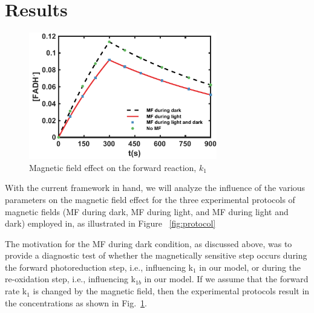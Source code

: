 \documentclass[twoside,twocolumn,9pt]{article}
\begin{document}
\section{Results}
\begin{figure}[h]
	\centering
	\includegraphics[width = \columnwidth, height = 5.53cm]{MfForward.pdf}
	\caption{Magnetic field effect on the forward reaction, $k_{1}$ }
	\label{fig:MfForward}
\end{figure}
With the current framework in hand, we will analyze the influence of the various parameters on the magnetic field effect for the
three experimental protocols of magnetic fields (MF during dark, MF during light, and MF during light and dark) employed in,
\cite{Pooam2019} as illustrated in Figure ~\ref{fig:protocol}

The motivation for the MF during dark condition, as discussed above, was to provide a diagnostic test of whether the magnetically
sensitive step occurs during the forward photoreduction step, i.e., influencing k$_{1}$ in our model, or during the re-oxidation
step, i.e., influencing k$_{1b}$ in our model. If we assume that the forward rate k$_{1}$ is changed by the magnetic field, then
the experimental protocols result in the concentrations as shown in Fig.~\ref{fig:MfForward}.
\end{document}
